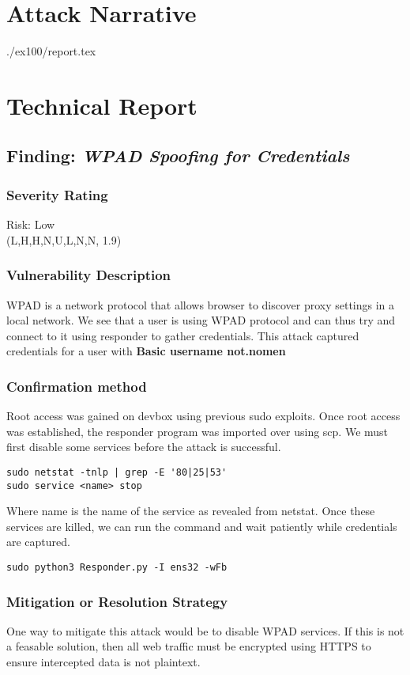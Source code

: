 \section{Attack Narrative}
./ex100/report.tex

\section{Technical Report}

  \subsection{Finding: \emph{WPAD Spoofing for Credentials}}
  
	\subsubsection*{Severity Rating}
        Risk: Low \\
		\cvss(L,H,H,N,U,L,N,N, 1.9)
		
  	\subsubsection*{Vulnerability Description}
  		WPAD is a network protocol that allows browser to discover proxy settings in a local network. We see that a user is using WPAD protocol	and can thus 
        try and connect to it using responder to gather credentials. This attack captured credentials for a user with \textbf{Basic username {\:} not.nomen}
  	\subsubsection*{Confirmation method}
  	    Root access was gained on devbox using previous sudo exploits. Once root access was established, the responder program was imported over using scp.
        We must first disable some services before the attack is successful.
\begin{verbatim}
sudo netstat -tnlp | grep -E '80|25|53'
sudo service <name> stop
\end{verbatim}
    Where name is the name of the service as revealed from netstat. Once these services are killed, we can run the command and wait patiently while credentials are captured.
\begin{verbatim}
sudo python3 Responder.py -I ens32 -wFb
\end{verbatim}
				
    \subsubsection*{Mitigation or Resolution Strategy}
    One way to mitigate this attack would be to disable WPAD services. If this is not a feasable solution, then all web traffic must be encrypted using HTTPS to ensure
    intercepted data is not plaintext.
		



